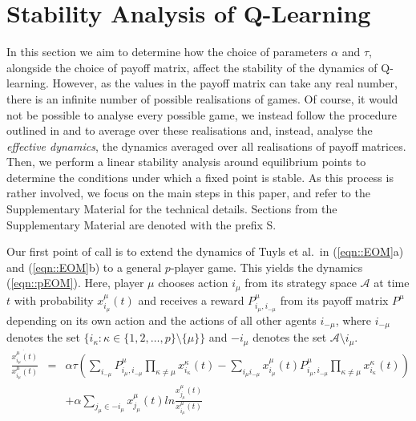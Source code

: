 \documentclass[sigconf,anonymous]{aamas}
\newcommand{\xmu}[2]{x_{#1_#2}^{#2}(t)}
\newcommand{\payoff}[2]{P^{#2}_{#1_#2, #1_{-#2}}}
\begin{document}
\section{Stability Analysis of Q-Learning} \label{sec::Theory}

In this section we aim to determine how the choice of parameters
$\alpha$ and $\tau$, alongside the choice of payoff matrix, affect the
stability of the dynamics of Q-learning. However, as the values in the
payoff matrix can take any real number, there is an infinite number
of possible realisations of games. Of course, it would not be possible
to analyse every possible game, we instead follow the procedure
outlined in \cite{Coolen2005} and \cite{Galla2013} to average over
these realisations and, instead, analyse the \textit{effective
  dynamics}, the dynamics averaged over all realisations of payoff
matrices. Then, we perform a linear stability analysis around
equilibrium points to determine the conditions under which a fixed
point is stable. As this process is rather involved, we focus on the main steps in this paper, and refer to the Supplementary Material for the technical details. Sections from the Supplementary Material are denoted with the prefix S.

Our first point of call is to extend the dynamics of Tuyls et al.~in
(\ref{eqn::EOM}a) and (\ref{eqn::EOM}b) to a general $p$-player
game. This yields the dynamics (\ref{eqn::pEOM}). Here, player $\mu$
chooses action $i_{\mu}$ from its strategy space $\mathcal{A}$ at time
$t$ with probability $\xmu{i}{\mu}$ and receives a reward
$\payoff{i}{\mu}$ from its payoff matrix $P^\mu$ depending on its own
action and the actions of all other agents $i_{-\mu}$, where $i_{-\mu}$ denotes the set $\{ i_\kappa : \kappa \in \{1, 2,
\ldots , p\} \setminus \{\mu\} \}$ and $-i_{\mu}$ denotes the set
$\mathcal{A} \setminus {i_\mu}$.
%
\begin{eqnarray}
    \frac{\dot{\xmu{i}{\mu}}}{\xmu{i}{\mu}} \! \! \! \! \! \! & = \! \! \! \! \! \! & \alpha \tau \left( \sum_{i_{-\mu}} \payoff{i}{\mu} \prod_{\kappa \neq \mu} \xmu{i}{\kappa} -  \sum_{i_\mu i_{-\mu}} \xmu{i}{\mu} \payoff{i}{\mu} \prod_{\kappa \neq \mu} \xmu{i}{\kappa} \right) \nonumber \\
    & & + \alpha \sum_{j_\mu \in -i_\mu} \xmu{j}{\mu} ln \frac{\xmu{j}{\mu}}{\xmu{i}{\mu}}     \label{eqn::pEOM}
\end{eqnarray}
\end{document}
